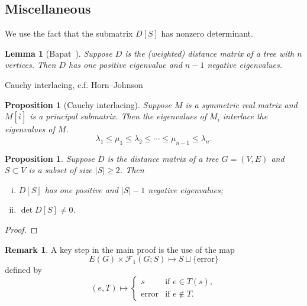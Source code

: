 \documentclass{amsart}
\newtheorem{prop}[thm]{Proposition}
\newtheorem{lem}[thm]{Lemma}
\theoremstyle{definition}
\newtheorem{rmk}[thm]{Remark}
\newcommand{\trees}{\mathcal{F}_1}
\begin{document}
\subsection{Miscellaneous}

We use the fact that the submatrix $D[S]$ has nonzero determinant.


\begin{lem}[{Bapat~\cite[Lemma 8.15]{bapat}}]
Suppose $D$ is the (weighted) distance matrix of a tree with $n$ vertices. 
Then $D$ has one positive eigenvalue and $n - 1$ negative eigenvalues.
\end{lem}

Cauchy interlacing, c.f. Horn--Johnson~\cite[Theorem 4.3.17]{horn-johnson}

\begin{prop}[Cauchy interlacing]
Suppose $M$ is a symmetric real matrix and $M[\overline{i}]$ is a principal submatrix.
Then the eigenvalues of $M_i$ interlace the eigenvalues of $M$.
\[
\lambda_1 \leq \mu_1 \leq \lambda_2 \leq \cdots \leq \mu_{n-1} \leq \lambda_n.
\]
\end{prop}

\begin{prop}
Suppose $D$ is the distance matrix of a tree $G = (V,E)$ and $S \subset V$ is a subset of size $|S| \geq 2$. 
Then
\begin{enumerate}[(i)]
\item $D[S]$ has one positive and $|S| - 1$ negative eigenvalues;

\item $\det D[S] \neq 0$.

\end{enumerate}
\end{prop}
\begin{proof}

\end{proof}


\begin{rmk}
A key step in the main proof is the use of the map
\[
	E(G) \times \trees(G;S) \mapsto S \sqcup \{\text{error}\}
\]
defined by
\[
	(e, T) \mapsto \begin{cases}
		s &\text{if } e \in T(s), \\
		\text{error} &\text{if } e \not\in T .
	\end{cases}
\]
\end{rmk}
\end{document}
